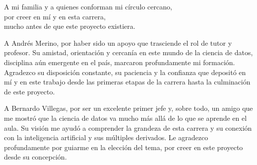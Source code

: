 \documentclass[11pt,oneside]{book}
\begin{document}
\frontmatter
\portadilla
\certificacion

\begin{dedicatoria}
    A mi familia y a quienes conforman mi círculo cercano, \\
    por creer en mí y en esta carrera, \\
    mucho antes de que este proyecto existiera.
\end{dedicatoria}

\begin{agradecimiento}
    A Andrés Merino, por haber sido un apoyo que trasciende el rol de tutor y profesor. Su amistad, orientación y cercanía en este mundo de la ciencia de datos, disciplina aún emergente en el país, marcaron profundamente mi formación. Agradezco su disposición constante, su paciencia y la confianza que depositó en mí y en este trabajo desde las primeras etapas de la carrera hasta la culminación de este proyecto.

    A Bernardo Villegas, por ser un excelente primer jefe y, sobre todo, un amigo que me mostró que la ciencia de datos va mucho más allá de lo que se aprende en el aula. Su visión me ayudó a comprender la grandeza de esta carrera y su conexión con la inteligencia artificial y sus múltiples derivados. Le agradezco profundamente por guiarme en la elección del tema, por creer en este proyecto desde su concepción.
\end{agradecimiento}


\tableofcontents

\mainmatter
\addtolength{\abovedisplayskip}{-2.2mm}
\addtolength{\belowdisplayskip}{-2.2mm}










\nocite{*}
\printbibliography


\end{document}
